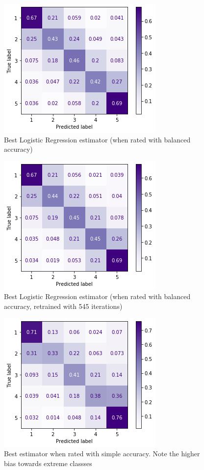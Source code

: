 \documentclass[letterpaper]{article}
\begin{document}
\begin{figure}[H]
    \centering
    \includegraphics[scale=0.65]{logreg-before.png}
    \caption{Best Logistic Regression estimator (when rated with balanced accuracy)}
\end{figure}

\begin{figure}[H]
    \centering
    \includegraphics[scale=0.65]{logreg-after.png}
    \caption{Best Logistic Regression estimator (when rated with balanced accuracy, retrained with 545 iterations)}
\end{figure}

\begin{figure}[H]
    \centering
    \includegraphics[scale=0.65]{log-regression-best-simple.png}
    \caption{Best estimator when rated with simple accuracy. Note the higher bias towards extreme classses}
\end{figure}
\end{document}
